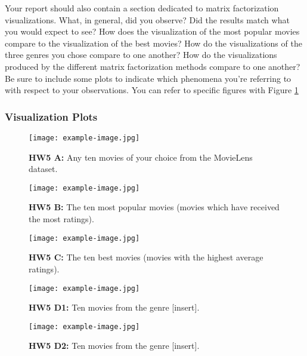 Your report should also contain a section dedicated to matrix factorization visualizations. What, in general, did you observe? Did the results match what you would expect to see? How does the visualization of the most popular movies compare to the visualization of the best movies? How do the visualizations of the three genres you chose compare to one another? How do the visualizations produced by the different matrix factorization methods compare to one another? Be sure to include some plots to indicate which phenomena you’re referring to with respect to your observations. You can refer to specific figures with Figure \ref{fig:hw5_vis_a}

\subsubsection{Visualization Plots}

\begin{figure}[!h]
    \centering
    \texttt{[image: example-image.jpg]}
    \caption{\textbf{HW5 A:} Any ten movies of your choice from the MovieLens dataset.}
    \label{fig:hw5_vis_a}
\end{figure}

\begin{figure}[!h]
    \centering
    \texttt{[image: example-image.jpg]}
    \caption{\textbf{HW5 B:} The ten most popular movies (movies which have received the most ratings).}
    \label{fig:hw5_vis_b}
\end{figure}

\begin{figure}[!h]
    \centering
    \texttt{[image: example-image.jpg]}
    \caption{\textbf{HW5 C:} The ten best movies (movies with the highest average ratings).}
    \label{fig:hw5_vis_c}
\end{figure}

\begin{figure}[!h]
    \centering
    \texttt{[image: example-image.jpg]}
    \caption{\textbf{HW5 D1:} Ten movies from the genre [insert].}
    \label{fig:hw5_vis_d1}
\end{figure}

\begin{figure}[!h]
    \centering
    \texttt{[image: example-image.jpg]}
    \caption{\textbf{HW5 D2:} Ten movies from the genre [insert].}
    \label{fig:hw5_vis_d2}
\end{figure}

